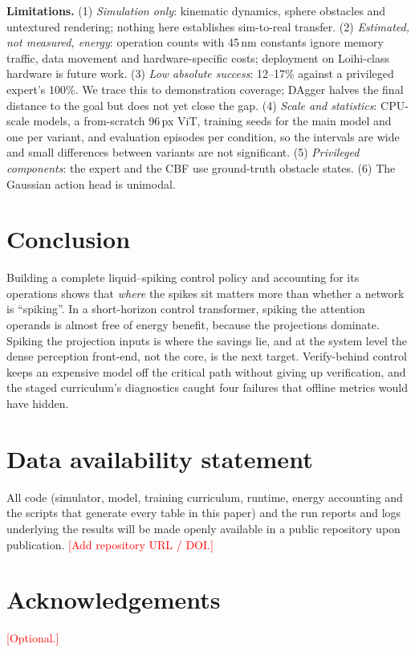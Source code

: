 \documentclass[12pt]{article}
\begin{document}
\textbf{Limitations.} (1) \emph{Simulation only}: kinematic dynamics, sphere obstacles and untextured rendering; nothing here establishes sim-to-real transfer. (2) \emph{Estimated, not measured, energy}: operation counts with 45\,nm constants ignore memory traffic, data movement and hardware-specific costs; deployment on Loihi-class hardware is future work. (3) \emph{Low absolute success}: 12--17\% against a privileged expert's 100\%. We trace this to demonstration coverage; DAgger halves the final distance to the goal but does not yet close the gap. (4) \emph{Scale and statistics}: CPU-scale models, a from-scratch 96\,px ViT, \nceNSeeds{} training seeds for the main model and one per variant, and \nceEvalEps{} evaluation episodes per condition, so the intervals are wide and small differences between variants are not significant. (5) \emph{Privileged components}: the expert and the CBF use ground-truth obstacle states. (6) The Gaussian action head is unimodal.

\section{Conclusion}
Building a complete liquid--spiking control policy and accounting for its operations shows that \emph{where} the spikes sit matters more than whether a network is ``spiking''. In a short-horizon control transformer, spiking the attention operands is almost free of energy benefit, because the projections dominate. Spiking the projection inputs is where the savings lie, and at the system level the dense perception front-end, not the core, is the next target. Verify-behind control keeps an expensive model off the critical path without giving up verification, and the staged curriculum's diagnostics caught four failures that offline metrics would have hidden.

\section*{Data availability statement}
All code (simulator, model, training curriculum, runtime, energy accounting and the scripts that generate every table in this paper) and the run reports and logs underlying the results will be made openly available in a public repository upon publication. \textcolor{red}{[Add repository URL / DOI.]}

\section*{Acknowledgements}
\textcolor{red}{[Optional.]}



\end{document}
